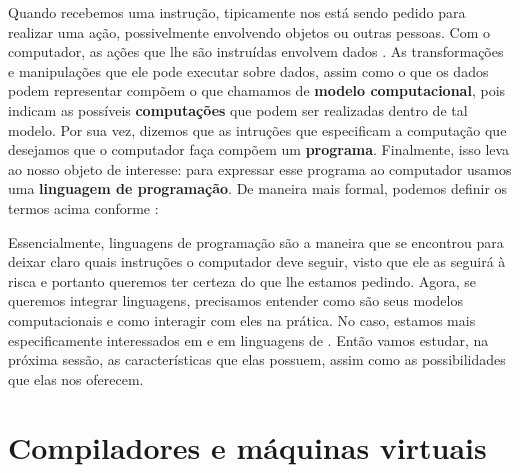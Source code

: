   Quando recebemos uma instrução, tipicamente nos está sendo pedido para
  realizar uma ação, possivelmente envolvendo objetos ou outras pessoas. Com o
  computador, as ações que lhe são instruídas envolvem dados \cite{org&arch:00}. As
  transformações e manipulações que ele pode executar sobre dados, assim como o
  que os dados podem representar compõem o que chamamos de \textbf{modelo
  computacional}, pois indicam as possíveis \textbf{computações} que podem ser
  realizadas dentro de tal modelo. Por sua vez, dizemos que as intruções que
  especificam a computação que desejamos que o computador faça compõem um
  \textbf{programa}. Finalmente, isso leva ao nosso objeto de interesse: para
  expressar esse programa ao computador usamos uma \textbf{linguagem de
  programação}. De maneira mais formal, podemos definir os termos acima conforme
  \cite{pl:00}:

  \vspace{2em}

  
  Essencialmente, linguagens de programação são a maneira que se encontrou para
  deixar claro quais instruções o computador deve seguir, visto que ele as
  seguirá à risca e portanto queremos ter certeza do que lhe estamos pedindo.
  Agora, se queremos integrar linguagens, precisamos entender como são seus
  modelos computacionais e como interagir com eles na prática. No caso, estamos
  mais especificamente interessados em \CXX{} e em linguagens de \script{}.
  Então vamos estudar, na próxima sessão, as características que elas possuem,
  assim como as possibilidades que elas nos oferecem.

  \section{Compiladores e máquinas virtuais}
  \label{cap:conceitos:compiladores}

